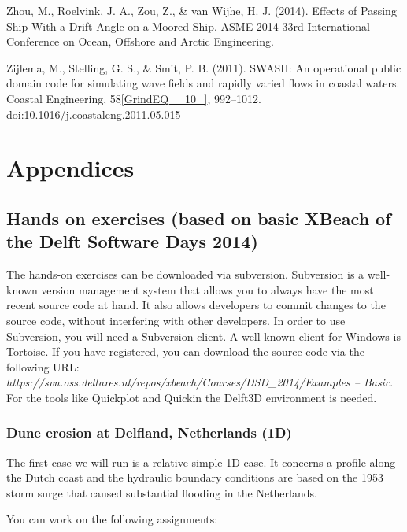 \documentclass{article}
\begin{document}
\noindent Zhou, M., Roelvink, J. A., Zou, Z., \& van Wijhe, H. J. (2014). Effects of Passing Ship With a Drift Angle on a Moored Ship. ASME 2014 33rd International Conference on Ocean, Offshore and Arctic Engineering.

\noindent Zijlema, M., Stelling, G. S., \& Smit, P. B. (2011). SWASH: An operational public domain code for simulating wave fields and rapidly varied flows in coastal waters. Coastal Engineering, 58\eqref{GrindEQ__10_}, 992--1012. doi:10.1016/j.coastaleng.2011.05.015

\noindent \eject 


\section{ Appendices}


\subsection{ Hands on exercises (based on basic XBeach of the Delft Software Days 2014)}

\noindent The hands-on exercises can be downloaded via subversion.  Subversion is a well-known version management system that allows you to always have the most recent source code at hand. It also allows developers to commit changes to the source code, without interfering with other developers. In order to use Subversion, you will need a Subversion client. A well-known client for Windows is Tortoise. If you have registered, you can download the source code via the following URL:\textit{ https://svn.oss.deltares.nl/repos/xbeach/Courses/DSD\_2014/Examples -- Basic}. For the tools like Quickplot and Quickin the Delft3D environment is needed.


\subsubsection{ Dune erosion at Delfland, Netherlands (1D)}

\noindent The first case we will run is a relative simple 1D case. It concerns a profile along the Dutch coast and the hydraulic boundary conditions are based on the 1953 storm surge that caused substantial flooding in the Netherlands. 

\noindent 

\noindent You can work on the following assignments:

\noindent 
\end{document}
